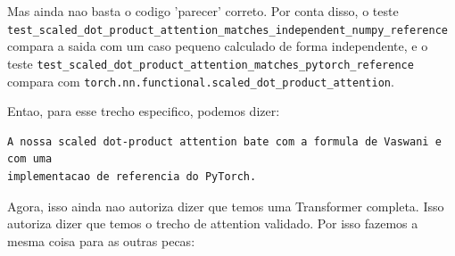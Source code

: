 Mas ainda nao basta o codigo 'parecer' correto. Por conta disso, o teste \texttt{test\_\allowbreak{}scaled\_\allowbreak{}dot\_\allowbreak{}product\_\allowbreak{}attention\_\allowbreak{}matches\_\allowbreak{}independent\_\allowbreak{}numpy\_\allowbreak{}reference} compara a saida com um caso pequeno calculado de forma independente, e o teste \texttt{test\_\allowbreak{}scaled\_\allowbreak{}dot\_\allowbreak{}product\_\allowbreak{}attention\_\allowbreak{}matches\_\allowbreak{}pytorch\_\allowbreak{}reference} compara com \texttt{torch.\allowbreak{}nn.\allowbreak{}functional.\allowbreak{}scaled\_\allowbreak{}dot\_\allowbreak{}product\_\allowbreak{}attention}.



Entao, para esse trecho especifico, podemos dizer:



\begin{Verbatim}[fontsize=\small,breaklines=true,label=text]
A nossa scaled dot-product attention bate com a formula de Vaswani e com uma
implementacao de referencia do PyTorch.
\end{Verbatim}





Agora, isso ainda nao autoriza dizer que temos uma Transformer completa. Isso autoriza dizer que temos o trecho de attention validado. Por isso fazemos a mesma coisa para as outras pecas:



